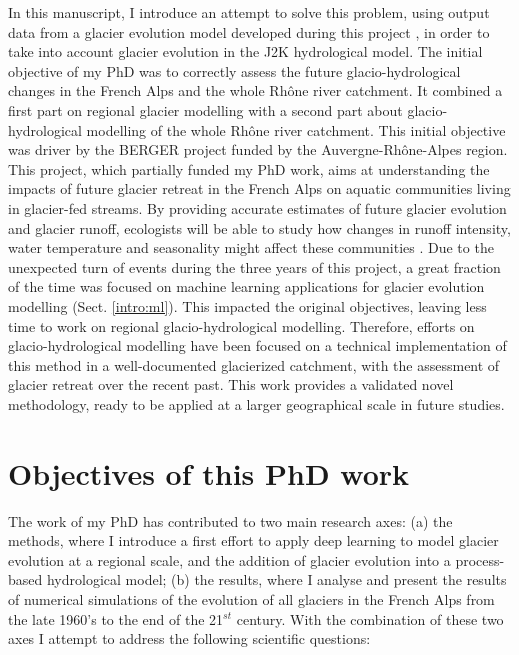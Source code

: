 In this manuscript, I introduce an attempt to solve this problem, using output data from a glacier evolution model developed during this project \citep{bolibar_alpgm_2020}, in order to take into account glacier evolution in the J2K hydrological model. The initial objective of my PhD was to correctly assess the future glacio-hydrological changes in the French Alps and the whole Rhône river catchment. It combined a first part on regional glacier modelling with a second part about glacio-hydrological modelling of the whole Rhône river catchment. This initial objective was driver by the BERGER project funded by the Auvergne-Rhône-Alpes region. This project, which partially funded my PhD work, aims at understanding the impacts of future glacier retreat in the French Alps on aquatic communities living in glacier-fed streams. By providing accurate estimates of future glacier evolution and glacier runoff, ecologists will be able to study how changes in runoff intensity, water temperature and seasonality might affect these communities \citep{robinson_ecosystem_2014, cauvy-fraunie_global_2019}. Due to the unexpected turn of events during the three years of this project, a great fraction of the time was focused on machine learning applications for glacier evolution modelling (Sect. \ref{intro:ml}). This impacted the original objectives, leaving less time to work on regional glacio-hydrological modelling. Therefore, efforts on glacio-hydrological modelling have been focused on a technical implementation of this method in a well-documented glacierized catchment, with the assessment of glacier retreat over the recent past. This work provides a validated novel methodology, ready to be applied at a larger geographical scale in future studies.

\section*{Objectives of this PhD work}

The work of my PhD has contributed to two main research axes: (a) the methods, where I introduce a first effort to apply deep learning to model glacier evolution at a regional scale, and the addition of glacier evolution into a process-based hydrological model; (b) the results, where I analyse and present the results of numerical simulations of the evolution of all glaciers in the French Alps from the late 1960's to the end of the 21$^{st}$ century. With the combination of these two axes I attempt to address the following scientific questions:
 
